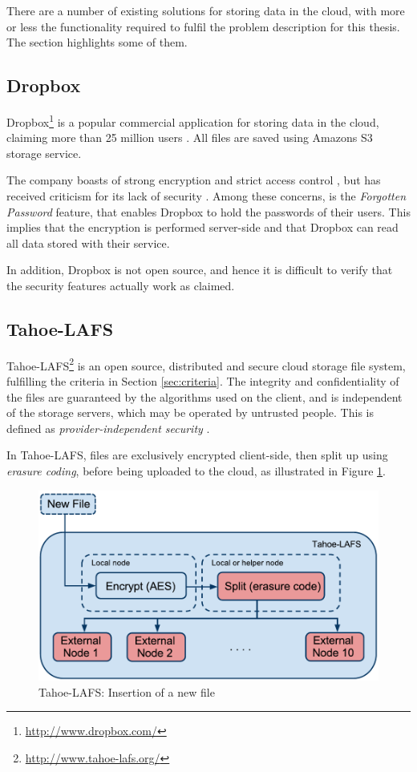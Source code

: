 \documentclass[pdftex,english,10pt,b5paper,twoside]{book}
\begin{document}
There are a number of existing solutions for storing data in the cloud,
with more or less the functionality required to fulfil the problem
description for this thesis. The section highlights some of them.

\subsection{Dropbox}

Dropbox\footnote{\url{http://www.dropbox.com/}} is a popular commercial
application for storing data in the cloud, claiming more than 25 million users
\cite{dropbox_users}. All files are saved using Amazons S3 storage service.

The company boasts of strong encryption and strict access control
\cite{dropbox_security}, but has received criticism for its lack of security
\cite{dropbox_concerns}. Among these concerns, is the \emph{Forgotten Password}
feature, that enables Dropbox to hold the passwords of their users. This
implies that the encryption is performed server-side and that Dropbox can read
all data stored with their service.

In addition, Dropbox is not open source, and hence it is difficult to verify
that the security features actually work as claimed.

\subsection{Tahoe-LAFS}
\label{sec:tahoe}

Tahoe-\ac{LAFS}\footnote{\url{http://www.tahoe-lafs.org/}} is an open source,
distributed and secure cloud storage file system, fulfilling the criteria in
Section \ref{sec:criteria}. The integrity and confidentiality of the
files are guaranteed by the algorithms used on the client, and is independent
of the storage servers, which may be operated by untrusted people.
This is defined as \emph{provider-independent security} \cite{tahoe}.

In Tahoe-\ac{LAFS}, files are exclusively encrypted client-side, then split up
using \emph{erasure coding}, before being uploaded to the cloud, as illustrated
in Figure \ref{fig:B:tahoe}.

\begin{figure}[h!]
    \centering
    \includegraphics[width=\columnwidth]{Tahoe-newfile.pdf}
    \caption{Tahoe-LAFS: Insertion of a new file}
    \label{fig:B:tahoe}
\end{figure}
\end{document}
